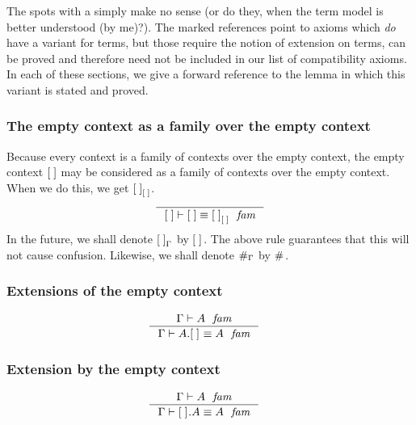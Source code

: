 The spots with a \xmark simply make no sense 
{\color{red}(or do they, when the term model
is better understood (by me)?)}. The marked references point to
axioms which \emph{do} have a variant for terms, but those require the notion
of extension on terms, can be proved and therefore need not be included in our
list of compatibility axioms. In each of these sections, we give a forward
reference to the lemma in which this variant is stated and proved.

\subsubsection{The empty context as a family over the empty context}
\label{comp-00}
Because every context is a family of contexts over the empty context, 
the empty context $\emptyc$ may be considered as a family of contexts over the empty
context. When we do this, we get $\emptyf[\emptyc]$.
\begin{equation}\label{eq:comp-00}
\inference
  { }
  { \jfameq
      {\emptyc}
      {\emptyc}
      {\emptyf[\emptyc]}
    }
\end{equation}
In the future, we shall denote $\emptyf[\Gamma]$ by $\emptyf$. The above rule
guarantees that this will not cause confusion. Likewise, we shall denote
$\emptytm[\Gamma]$ by $\emptytm$.

\subsubsection{Extensions of the empty context}
\label{comp-e0}
\begin{align}
& \inference
  { \jfam{\Gamma}{A}
    }
  { \jfameq{\Gamma}{{A}{\emptyf}}{A}
    }
  \label{comp-e0-f}
\end{align}

\subsubsection{Extension by the empty context}
\label{comp-0e}
\begin{align}
& \inference
  { \jfam{\Gamma}{A}
    }
  { \jfameq{\Gamma}{\ctxext{\emptyf}{A}}{A}
    }
  \label{comp-0e-f}
\end{align}

